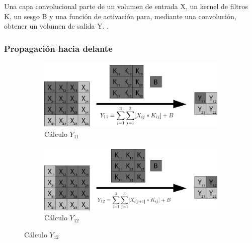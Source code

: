 Una capa convolucional parte de un volumen de entrada X, un kernel de filtros K, un sesgo B y una función de activación para, mediante una convolución, obtener un volumen de salida Y. \cite{capa_convolucional} \cite{capa_convolucional_Stanford}.

\subsubsection{Propagación hacia delante}

\begin{figure}[H]
	\centering
	\begin{subfigure}{.5\textwidth}
		\hspace{-10mm}
		\includegraphics[width=1.2\linewidth]{imagenes/conv_1.jpg}  
		\caption{Cálculo $Y_{11}$}
	\end{subfigure}%
	\begin{subfigure}{.5\textwidth}
		\hspace{10mm}
		\includegraphics[width=1.2\linewidth]{imagenes/conv_2.jpg}  
		\caption{Cálculo $Y_{12}$}
	\end{subfigure}
	

\end{figure}
